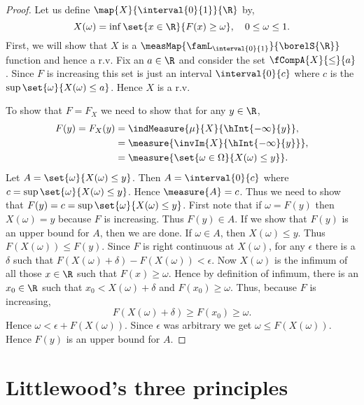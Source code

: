 \begin{proof}
    Let us define $\map{X}{\interval{0}{1}}{\R}$ by,
    \[X(\omega) = \inf\set{x\in\R}{F(x)\geq \omega},\quad 0\leq\omega\leq 1.\]
    First, we will show that $X$ is a $\measMap{\famL_{\interval{0}{1}}}{\borelS{\R}}$ function and hence a 
    r.v. Fix an $a \in \R$ and consider the set $\fCompA{X}{\leq}{a}$. Since $F$ is increasing this set is
    just an interval $\interval{0}{c}$ where $c$ is the $\sup\set{\omega}{X(\omega)\leq a}$. Hence $X$ is a r.v.

    To show that $F = F_X$ we need to show that for any $y\in \R$,
    \begin{align*}
	F(y) = F_X(y) &= \indMeasure{\mu}{X}{\hInt{-\infty}{y}},\\
	& = \measure{\invIm{X}{\hInt{-\infty}{y}}},\\
	& = \measure{\set{\omega\in\Omega}{X(\omega)\leq y}}.
    \end{align*}
    Let $A = \set{\omega}{X(\omega)\leq y}$. Then $A = \interval{0}{c}$ where 
    $c = \sup\set{\omega}{X(\omega)\leq y}$. Hence $\measure{A} = c$. Thus we need
    to show that $F(y) = c = \sup\set{\omega}{X(\omega)\leq y}$.
    First note that if $\omega = F(y)$ then $X(\omega) = y$ because $F$ is increasing. Thus $F(y) \in A$. If
    we show that $F(y)$ is an upper bound for $A$, then we are done. If $\omega \in A$, then $X(\omega) \leq
    y$. Thus $F(X(\omega)) \leq F(y)$. Since $F$ is right continuous at $X(\omega)$, for any $\epsilon$ there
    is a $\delta$ such that $F(X(\omega) + \delta) - F(X(\omega)) < \epsilon$. Now $X(\omega)$ is the infimum
    of all those $x \in \R$ such that $F(x) \geq \omega$. Hence by definition of infimum, 
    there is an $x_0 \in\R$ such that $x_0 <
    X(\omega) + \delta$ and $F(x_0) \geq \omega$. Thus, because $F$ is increasing,
    \[F(X(\omega)+\delta) \geq F(x_0) \geq \omega.\]
    Hence $\omega < \epsilon + F(X(\omega))$. Since $\epsilon$ was arbitrary we get $\omega \leq
    F(X(\omega))$. Hence $F(y)$ is an upper bound for $A$.
\end{proof}
\section{Littlewood's three principles}
